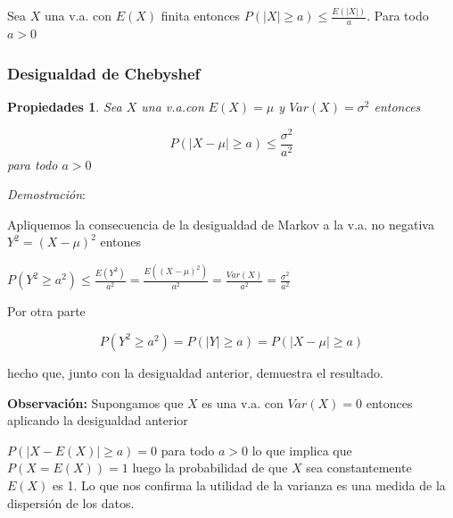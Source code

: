 \documentclass[handout]{beamer}\usepackage[]{graphicx}\usepackage[]{color}
\renewcommand{\leq}{\leqslant}
\renewcommand{\geq}{\geqslant}
\theoremstyle{plain}
\newtheorem{prop}{Propiedades}
\theoremstyle{definition}
\begin{document}
\begin{frame}

\begin{corollary}
Sea $X$ una v.a. con $E(X)$ finita entonces $P(|X|\geq a )\leq
\frac{E(|X|)}{a}$. Para todo $a>0$
\end{corollary}

\end{frame}
\subsubsection{Desigualdad de Chebyshef}
\begin{frame}


\begin{prop}
Sea  $X$ una v.a.con $E(X)=\mu$ y $Var(X)=\sigma^2$ entonces

$$P(|X-\mu|\geq a)\leq \frac{\sigma^{2}}{a^2}$$ para todo $a>0$
\end{prop}

\end{frame}

\begin{frame}

\textit{Demostración}:

Apliquemos la consecuencia de la desigualdad de Markov a la v.a.
no negativa $Y^2=(X-\mu)^{2}$ entones

$P(Y^2\geq a^2)\leq
\frac{E(Y^2)}{a^2}=\frac{E((X-\mu)^{2})}{a^2}=
\frac{Var(X)}{a^2}=\frac{\sigma^{2}}{a^{2}}$
\end{frame}

\begin{frame}

Por otra parte

$$P(Y^2\geq a^2)=P(|Y|\geq a)= P(|X-\mu|\geq a)$$

hecho que, junto con la desigualdad anterior,
demuestra el resultado.

\end{frame}

\begin{frame}


\textbf{Observación:} Supongamos que $X$ es una v.a. con $Var(X)=0$
entonces aplicando la desigualdad anterior

$P(|X-E(X)|\geq a )=0$ para todo $a>0$ lo que implica que
$P(X=E(X))=1$ luego la probabilidad de que $X$ sea
constantemente $E(X)$ es 1. Lo que nos confirma la utilidad de la varianza es una
medida de la dispersión de los datos.
\end{frame}
\end{document}
